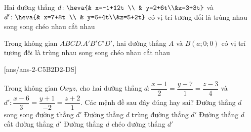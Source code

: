 \begin{ex}%
	Hai đường thẳng $d\colon \heva{& x=-1+12t \\ & y=2+6t\\&z=3+3t}$ và $d'\colon\heva{& x=7+8t \\ & y=6+4t\\&z=5+2t}$ có vị trí tương đối là
	\choice
	{\True trùng nhau}
	{song song}
	{chéo nhau}
	{cắt nhau}
\end{ex}
\begin{ex}%
	Trong không gian $ABCD.A'B'C'D'$, hai đường thẳng $A$ và $B(a;0;0)$ có vị trí tương đối là
	\choice
	{trùng nhau}
	{song song}
	{chéo nhau}
	{\True cắt nhau}
\end{ex}
\TNTF
{}[ans/ans-2-C5B2D2-DS]
\begin{ex}%
Trong không gian $Oxyz$, cho hai đường thẳng $d \colon \dfrac{x-1}{2}=\dfrac{y-7}{1}=\dfrac{z-3}{4}$ và  $d' \colon \dfrac{x-6}{3}=\dfrac{y+1}{-2}=\dfrac{z+2}{1}$. Các mệnh đề sau đây đúng hay sai?
\choiceTF
{Đường thẳng $d$ song song đường thẳng $d'$}
{Đường thẳng $d$ trùng đường thẳng $d'$}
{\True  Đường thẳng $d$ cắt đường thẳng $d'$}
{Đường thẳng $d$ chéo đường thẳng $d'$}
\end{ex}
